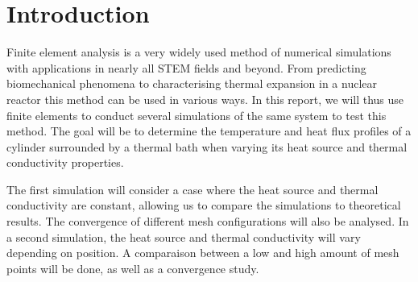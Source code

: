 \section{Introduction}

Finite element analysis is a very widely used method of numerical simulations with applications in nearly all STEM fields and beyond. From predicting biomechanical phenomena \cite{body} to characterising thermal expansion in a nuclear reactor \cite{nuke} this method can be used in various ways. In this report, we will thus use finite elements to conduct several simulations of the same system to test this method. The goal will be to determine the temperature and heat flux profiles of a cylinder surrounded by a thermal bath when varying its heat source and thermal conductivity properties.

The first simulation will consider a case where the heat source and thermal conductivity are constant, allowing us to compare the simulations to theoretical results. The convergence of different mesh configurations will also be analysed. In a second simulation, the heat source and thermal conductivity will vary depending on position. A comparaison between a low and high amount of mesh points will be done, as well as a convergence study.

\newpage